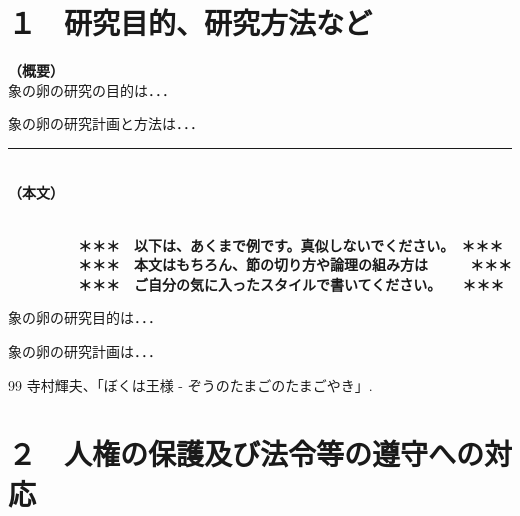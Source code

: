 \documentclass[11pt,a4j,dvipdfmx]{jarticle} 					%
\newcommand{\研究課題名}{象の卵}
\newcommand{\研究機関名}{逢坂大学}
\newcommand{\研究代表者氏名}{湯川秀樹}
\newcommand{\研究期間の最終元号年度}{9}  %
\begin{document}

\section{１　研究目的、研究方法など}

\noindent
\textbf{（概要）}\\
	象の卵の研究の目的は．．．	

	象の卵の研究計画と方法は．．．
	\vspace*{10zw}	%

\noindent
\rule{\linewidth}{1pt}\\
\noindent
\textbf{（本文）}
\JSPSInstructions	%

\textbf{\\　　　　　＊＊＊　以下は、あくまで例です。真似しないでください。　＊＊＊\\
　　　　　＊＊＊　本文はもちろん、節の切り方や論理の組み方は　　　＊＊＊\\
　　　　　＊＊＊　ご自分の気に入ったスタイルで書いてください。　　＊＊＊}

	 象の卵の研究目的は．．．

	象の卵の研究計画は．．．

		

	\vspace{1cm}
	\begin{thebibliography}{99}
		 寺村輝夫、「ぼくは王様 - ぞうのたまごのたまごやき」.
	\end{thebibliography}




\section{２　人権の保護及び法令等の遵守への対応}
\end{document}
